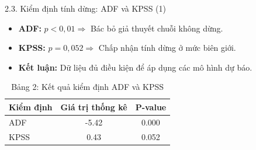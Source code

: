 \documentclass[aspectratio=43]{beamer}
\begin{document}
\begin{frame}{2.3. Kiểm định tính dừng: ADF và KPSS (1)}
    \begin{itemize}
        \item \textbf{ADF:} $p < 0,01 \Rightarrow$ Bác bỏ giả thuyết chuỗi không dừng.
        \item \textbf{KPSS:} $p = 0,052 \Rightarrow$ Chấp nhận tính dừng ở mức biên giới.
        \item \textbf{Kết luận:} Dữ liệu đủ điều kiện để áp dụng các mô hình dự báo.
    \end{itemize}
    \begin{table}
        \centering
        \caption{Bảng 2: Kết quả kiểm định ADF và KPSS}
        \begin{tabular}{lcc}
        \toprule
        \textbf{Kiểm định} & \textbf{Giá trị thống kê} & \textbf{P-value} \\ \midrule
        ADF & -5.42 & 0.000 \\
        KPSS & 0.43 & 0.052 \\ \bottomrule
        \end{tabular}
    \end{table}
\end{frame}
\end{document}
